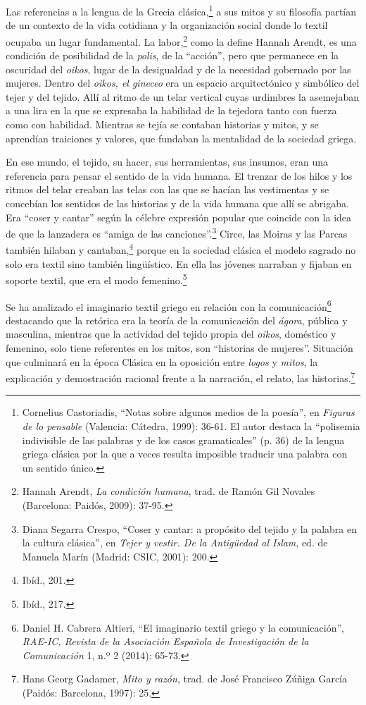 \documentclass{tufte-handout}
\begin{document}
Las referencias a la lengua de la Grecia clásica,\footnote{Cornelius
  Castoriadis, ``Notas sobre algunos medios de la poesía'', en
  \emph{Figuras de lo pensable} (Valencia: Cátedra, 1999): 36-61. El
  autor destaca la ``polisemia indivisible de las palabras y de los
  casos gramaticales'' (p. 36) de la lengua griega clásica por la que a
  veces resulta imposible traducir una palabra con un sentido único.} a
sus mitos y su filosofía partían de un contexto de la vida cotidiana y
la organización social donde lo textil ocupaba un lugar fundamental. La
labor,\footnote{Hannah Arendt, \emph{La condición humana}, trad. de
  Ramón Gil Novales (Barcelona: Paidós, 2009): 37-95.} como la define
Hannah Arendt, es una condición de posibilidad de la \emph{polis}, de la
``acción'', pero que permanece en la oscuridad del \emph{oikos}, lugar
de la desigualdad y de la necesidad gobernado por las mujeres. Dentro
del \emph{oikos, el gineceo} era un espacio arquitectónico y simbólico
del tejer y del tejido. Allí al ritmo de un telar vertical cuyas
urdimbres la asemejaban a una lira en la que se expresaba la habilidad
de la tejedora tanto con fuerza como con habilidad. Mientras se tejía se
contaban historias y mitos, y se aprendían traiciones y valores, que
fundaban la mentalidad de la sociedad griega.

En ese mundo, el tejido, su hacer, sus herramientas, sus insumos, eran
una referencia para pensar el sentido de la vida humana. El trenzar de
los hilos y los ritmos del telar creaban las telas con las que se hacían
las vestimentas y se concebían los sentidos de las historias y de la
vida humana que allí se abrigaba. Era ``coser y cantar'' según la
célebre expresión popular que coincide con la idea de que la lanzadera
es ``amiga de las canciones''.\footnote{Diana Segarra Crespo, ``Coser y
  cantar: a propósito del tejido y la palabra en la cultura clásica'',
  en \emph{Tejer y vestir. De la Antigüedad al Islam}, ed. de Manuela
  Marín (Madrid: CSIC, 2001): 200.} Circe, las Moiras y las Parcas
también hilaban y cantaban,\footnote{Ibíd., 201.} porque en la sociedad
clásica el modelo sagrado no solo era textil sino también lingüístico.
En ella las jóvenes narraban y fijaban en soporte textil, que era el
modo femenino.\footnote{Ibíd., 217.}

Se ha analizado el imaginario textil griego en relación con la
comunicación\footnote{Daniel H. Cabrera Altieri, ``El imaginario textil
  griego y la comunicación'', \emph{RAE-IC, Revista de la Asociación
  Española de Investigación de la Comunicación} 1, n.º 2 (2014): 65-73.}
destacando que la retórica era la teoría de la comunicación del
\emph{ágora}, pública y masculina, mientras que la actividad del tejido
propia del \emph{oikos}, doméstico y femenino, solo tiene referentes en
los mitos, son ``historias de mujeres''. Situación que culminará en la
época Clásica en la oposición entre \emph{logos} y \emph{mitos}, la
explicación y demostración racional frente a la narración, el relato,
las historias.\footnote{Hans Georg Gadamer, \emph{Mito y razón}, trad.
  de José Francisco Zúñiga García (Paidós: Barcelona, 1997): 25.}
\end{document}
